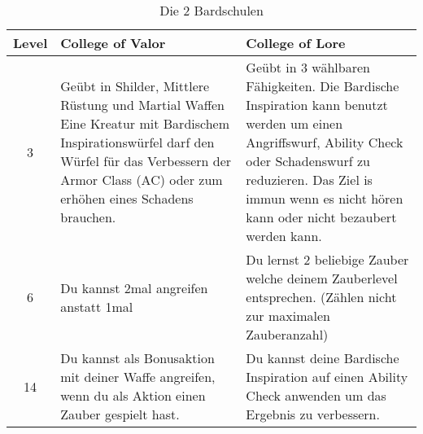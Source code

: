 \begin{table}
	\centering
	\begin{tabular}{cp{6cm}p{6cm}}
	\textbf{Level} & \textbf{College of Valor} & \textbf{College of Lore}\\ \hline
	3 &
	Geübt in Shilder, Mittlere Rüstung und Martial Waffen \linebreak
	Eine Kreatur mit Bardischem Inspirationswürfel darf den Würfel für das Verbessern der Armor Class (AC) oder
	zum erhöhen eines Schadens brauchen. &
	Geübt in 3 wählbaren Fähigkeiten.\linebreak
	Die Bardische Inspiration kann benutzt werden um einen Angriffswurf, Ability Check oder Schadenswurf zu reduzieren. Das Ziel is immun wenn es nicht hören kann oder nicht bezaubert werden kann.\\ \hline
	6 &
	Du kannst 2mal angreifen anstatt 1mal &
	Du lernst 2 beliebige Zauber welche deinem Zauberlevel entsprechen. (Zählen nicht zur maximalen Zauberanzahl)\\ \hline
	14 &
	Du kannst als Bonusaktion mit deiner Waffe angreifen, wenn du als Aktion einen Zauber gespielt hast. &
	Du kannst deine Bardische Inspiration auf einen Ability Check anwenden um das Ergebnis zu verbessern.
	\end{tabular}
	\caption{Die 2 Bardschulen}
\end{table}